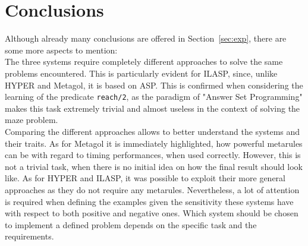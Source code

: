 \section{Conclusions}\label{sec:conc}
Although already many conclusions are offered in Section~\ref{sec:exp},
there are some more aspects to mention:\\

The three systems require completely different approaches
to solve the same problems encountered. This is particularly evident for ILASP, since,
unlike HYPER and Metagol, it is based on ASP. This is confirmed when
considering the learning of the predicate \texttt{reach/2}, as the paradigm of "Answer Set
Programming" makes this task extremely trivial and almost useless in the context of
solving the maze problem.\\

Comparing the different approaches allows to better understand the
systems and their traits.
As for Metagol it is immediately highlighted, how powerful metarules can be with regard to 
timing performances, when used correctly. However, this is not a trivial task, when there is no
initial idea on how the final result should look like. As for HYPER and ILASP, it was possible to exploit
their more general approaches as they do not require any metarules. Nevertheless, a lot of attention is required
when defining the examples given the sensitivity these systems have with respect to both positive and negative ones.
Which system should be chosen to implement a defined problem depends on the specific task and the requirements.

